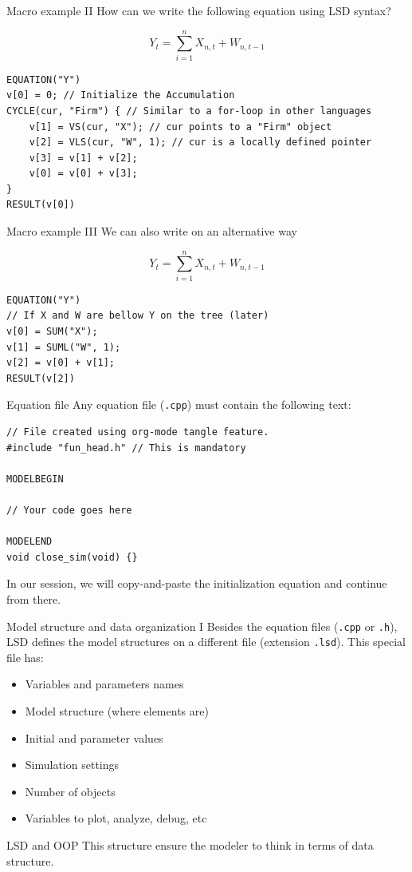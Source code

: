 \documentclass[bigger,aspectratio=169]{beamer}
\begin{document}
\begin{frame}[label={sec:org722cbb5},fragile]{Macro example II}
 How can we write the following equation using LSD syntax?

\[Y_{t} = \sum_{i=1}^{n} X_{n,t} + W_{n,t-1}\]



\begin{verbatim}
EQUATION("Y")
v[0] = 0; // Initialize the Accumulation
CYCLE(cur, "Firm") { // Similar to a for-loop in other languages
    v[1] = VS(cur, "X"); // cur points to a "Firm" object
    v[2] = VLS(cur, "W", 1); // cur is a locally defined pointer
    v[3] = v[1] + v[2];
    v[0] = v[0] + v[3];
}
RESULT(v[0])
\end{verbatim}
\end{frame}
\begin{frame}[label={sec:org9bcd15e},fragile]{Macro example III}
 We can also write on an alternative way

\[Y_{t} = \sum_{i=1}^{n} X_{n,t} + W_{n,t-1}\]



\begin{verbatim}
EQUATION("Y")
// If X and W are bellow Y on the tree (later)
v[0] = SUM("X");
v[1] = SUML("W", 1);
v[2] = v[0] + v[1];
RESULT(v[2])
\end{verbatim}
\end{frame}
\begin{frame}[label={sec:orga00e2dd},fragile]{Equation file}
 Any equation file (\texttt{.cpp}) must contain the following text:
\begin{verbatim}
// File created using org-mode tangle feature.
#include "fun_head.h" // This is mandatory

MODELBEGIN

// Your code goes here

MODELEND
void close_sim(void) {}
\end{verbatim}

In our session, we will copy-and-paste the initialization equation and continue from there.
\end{frame}
\begin{frame}[label={sec:org135c0f9},fragile]{Model structure and data organization I}
 Besides the equation files (\texttt{.cpp} or \texttt{.h}), LSD defines the model structures on a different file (extension \texttt{.lsd}).
This special file has:

\begin{itemize}
\item Variables and parameters names
\item Model structure (where elements are)
\item Initial and parameter values
\item Simulation settings
\item Number of objects
\item Variables to plot, analyze, debug, etc
\end{itemize}
\begin{block}{LSD and OOP}
This structure ensure the modeler to think in terms of data structure.
\end{block}
\end{frame}
\end{document}
